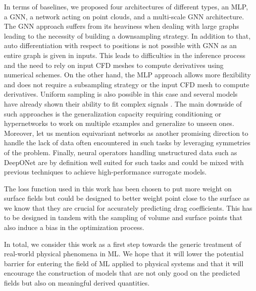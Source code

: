 In terms of baselines, we proposed four architectures of different types, an \acrshort{MLP}, a \acrshort{GNN}, a network acting on point clouds, and a multi-scale \acrshort{GNN} architecture. The \acrshort{GNN} approach suffers from its heaviness when dealing with large graphs leading to the necessity of building a downsampling strategy. In addition to that, auto differentiation with respect to positions is not possible with \acrshort{GNN} as an entire graph is given in inputs. This leads to difficulties in the inference process and the need to rely on input \acrshort{CFD} meshes to compute derivatives using numerical schemes. On the other hand, the \acrshort{MLP} approach allows more flexibility and does not require a subsampling strategy or the input \acrshort{CFD} mesh to compute derivatives. Uniform sampling is also possible in this case and several models have already shown their ability to fit complex signals \cite{siren,bacon}. The main downside of such approaches is the generalization capacity requiring conditioning or hypernetworks to work on multiple examples and generalize to unseen ones. Moreover, let us mention equivariant networks \cite{brandstetter2022geometric} as another promising direction to handle the lack of data often encountered in such tasks by leveraging symmetries of the problem. Finally, neural operators handling unstructured data such as DeepONet \cite{lu2021learning} are by definition well suited for such tasks and could be mixed with previous techniques to achieve high-performance surrogate models.

The loss function used in this work has been chosen to put more weight on surface fields but could be designed to better weight point close to the surface as we know that they are crucial for accurately predicting drag coefficients. This has to be designed in tandem with the sampling of volume and surface points that also induce a bias in the optimization process.

In total, we consider this work as a first step towards the generic treatment of real-world physical phenomena in \acrshort{ML}. We hope that it will lower the potential barrier for entering the field of \acrshort{ML} applied to physical systems and that it will encourage the construction of models that are not only good on the predicted fields but also on meaningful derived quantities.

